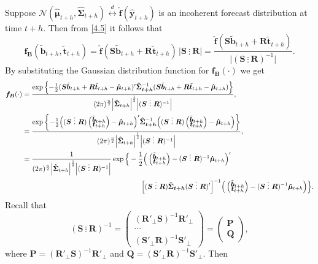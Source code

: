 \documentclass[a4paper, 11pt]{article}
\def\bt{\begin{pmatrix}\tilde{\bm{b}}_{t+h}\\[-0.2cm]\tilde{\bm{t}}_{t+h}\end{pmatrix}}
\begin{document}
Suppose $\mathcal{N}(\hat{\bm{\mu}}_{t+h}, \hat{\bm{\Sigma}}_{t+h}) \overset{d}{\leftrightarrow} \hat{\bm{f}}(\hat{\bm{y}}_{t+h})$ is an incoherent forecast distribution at time $t+h$. Then from \eqref{4.5} it follows that
\begin{equation}
\bm{f_B}(\tilde{\bm{b}}_{t+h},\tilde{\bm{t}}_{t+h})=\hat{\bm{f}}(\bm{S}\tilde{\bm{b}}_{t+h}+\bm{R}\tilde{\bm{t}}_{t+h}) \, \Big|\bm{S} ~ \vdots~ \bm{R}\Big| = \frac{\hat{\bm{f}}(\bm{S}\tilde{\bm{b}}_{t+h}+\bm{R}\tilde{\bm{t}}_{t+h}) }{\Big|(\bm{S} ~ \vdots~ \bm{R})^{-1}\Big|}.
\end{equation}
By substituting the Gaussian distribution function for $\bm{f_B}(\cdot)$ we get
\begin{align*}
\bm{f_B}(\cdot)
& =
\frac{\exp\left\{-\frac{1}{2}(\bm{S}\tilde{\bm{b}}_{t+h}+\bm{R}\tilde{\bm{t}}_{t+h}-\bm{\hat{\mu}}_{t+h})' \bm{\hat{\Sigma}_{t+h}}^{-1}(\bm{S}\tilde{\bm{b}}_{t+h}+\bm{R}\tilde{\bm{t}}_{t+h}-\bm{\hat{\mu}}_{t+h})\right\}}{(2\pi)^{\frac{n}{2}}\Big|\bm{\hat{\Sigma}}_{t+h}\Big|^{\frac{1}{2}}\Big|(\bm{S} ~ \vdots~ \bm{R})^{-1}\Big|},\\
& =
\frac{\exp\left\{-\frac{1}{2}\Big((\bm{S} ~ \vdots~ \bm{R})\bt-\bm{\hat{\mu}}_{t+h}\Big)' \bm{\hat{\Sigma}_{t+h}}^{-1}\Big((\bm{S} ~ \vdots~ \bm{R})\bt-\bm{\hat{\mu}}_{t+h}\Big)\right\}}{(2\pi)^{\frac{n}{2}}\Big|\bm{\hat{\Sigma}}_{t+h}\Big|^{\frac{1}{2}}\Big|(\bm{S} ~ \vdots~ \bm{R})^{-1}\Big|},\\
& =
\frac{1}{(2\pi)^{\frac{n}{2}}\Big|\bm{\hat{\Sigma}}_{t+h}\Big|^{\frac{1}{2}}\Big|(\bm{S} ~ \vdots~ \bm{R})^{-1} \Big|}
\exp \Big\{-\frac{1}{2}\Big(\bt-(\bm{S} ~ \vdots~ \bm{R})^{-1}\bm{\hat{\mu}}_{t+h}\Big)'\\
& \hspace*{6cm} \Big[(\bm{S} ~ \vdots~ \bm{R})\bm{\hat{\Sigma}_{t+h}}(\bm{S} ~ \vdots~ \bm{R})'\Big]^{-1}
\Big(\bt-(\bm{S} ~ \vdots~ \bm{R})^{-1}\bm{\hat{\mu}}_{t+h}\Big) \Big\}.
\end{align*}
Recall that
$$
(\bm{S} ~ \vdots~ \bm{R})^{-1} =
\begin{pmatrix}(\bm{R}'_\bot \bm{S})^{-1}\bm{R}'_\bot \\ \cdots \\ (\bm{S}'_\bot \bm{R})^{-1}\bm{S}'_\bot \end{pmatrix} =
\begin{pmatrix}
\bm{P} \\\bm{Q}
\end{pmatrix},
$$
where $\bm{P}=(\bm{R}'_\bot \bm{S})^{-1}\bm{R}'_\bot$ and $\bm{Q}=(\bm{S}'_\bot \bm{R})^{-1}\bm{S}'_\bot$. Then
\end{document}
